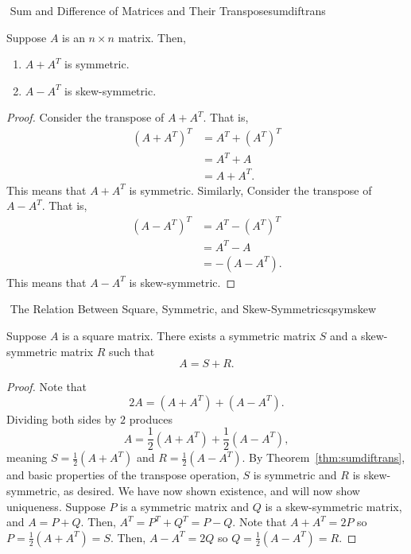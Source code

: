         \pagebreak
        \begin{theorem}{\Stop\,\,Sum and Difference of Matrices and Their Transpose}{sumdiftrans}
        
            Suppose \(A\) is an \(n\times n\) matrix. Then,
            \begin{enumerate}
                \item \(A+A^T\) is symmetric.
                \item \(A-A^T\) is skew-symmetric.
            \end{enumerate}
            \begin{proof}
                Consider the transpose of \(A+A^T\). That is,
                \begin{align*}
                    (A+A^T)^T&=A^T+(A^T)^T \\
                    &=A^T+A \\
                    &=A+A^T.
                \end{align*}
                This means that \(A+A^T\) is symmetric. Similarly, Consider the transpose of \(A-A^T\). That is,
                \begin{align*}
                    (A-A^T)^T&=A^T-(A^T)^T \\
                    &=A^T-A \\
                    &=-(A-A^T).
                \end{align*}
                This means that \(A-A^T\) is skew-symmetric.
            \end{proof}
        \end{theorem}
        \begin{theorem}{\Stop\,\,The Relation Between Square, Symmetric, and Skew-Symmetric}{sqsymskew}
        
            Suppose \(A\) is a square matrix. There exists a symmetric matrix \(S\) and a skew-symmetric matrix \(R\) such that
            \begin{equation*}
                A=S+R.
            \end{equation*}
            \begin{proof}
                Note that
                \begin{equation*}
                    2A=(A+A^T)+(A-A^T).
                \end{equation*}
                Dividing both sides by \(2\) produces
                \begin{equation*}
                    A=\frac{1}{2}(A+A^T)+\frac{1}{2}(A-A^T),
                \end{equation*}
                meaning \(S=\frac{1}{2}(A+A^T)\) and \(R=\frac{1}{2}(A-A^T)\). By Theorem~\ref{thm:sumdiftrans}, and basic properties of the transpose operation, \(S\) is symmetric and \(R\) is skew-symmetric, as desired. We have now shown existence, and will now show uniqueness. Suppose \(P\) is a symmetric matrix and \(Q\) is a skew-symmetric matrix, and \(A=P+Q\). Then, \(A^T=P^T+Q^T=P-Q\). Note that \(A+A^T=2P\) so \(P=\frac{1}{2}(A+A^T)=S\). Then, \(A-A^T=2Q\) so \(Q=\frac{1}{2}(A-A^T)=R\). 
            \end{proof}
        \end{theorem}
        
